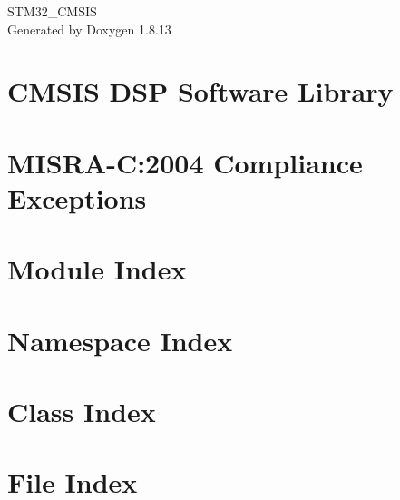 \documentclass[twoside]{book}
\newcommand{\+}{\discretionary{\mbox{\scriptsize$\hookleftarrow$}}{}{}}
\newcommand{\clearemptydoublepage}{%
  \newpage{\pagestyle{empty}\cleardoublepage}%
}
\begin{document}
\hypersetup{pageanchor=false,
             bookmarksnumbered=true,
             pdfencoding=unicode
            }
\begin{titlepage}
\vspace*{7cm}
\begin{center}%
{\Large S\+T\+M32\+\_\+\+C\+M\+S\+IS }\\
\vspace*{1cm}
{\large Generated by Doxygen 1.8.13}\\
\end{center}
\end{titlepage}
\clearemptydoublepage
{}
\tableofcontents
\clearemptydoublepage
{}
\hypersetup{pageanchor=true}

\chapter{C\+M\+S\+IS D\+SP Software Library}
\label{index}\hypertarget{index}{}
\chapter{M\+I\+S\+R\+A-\/C\+:2004 Compliance Exceptions}
\label{_c_m_s_i_s__m_i_s_r_a__exceptions}

\chapter{Module Index}

\chapter{Namespace Index}

\chapter{Class Index}

\chapter{File Index}

\end{document}

